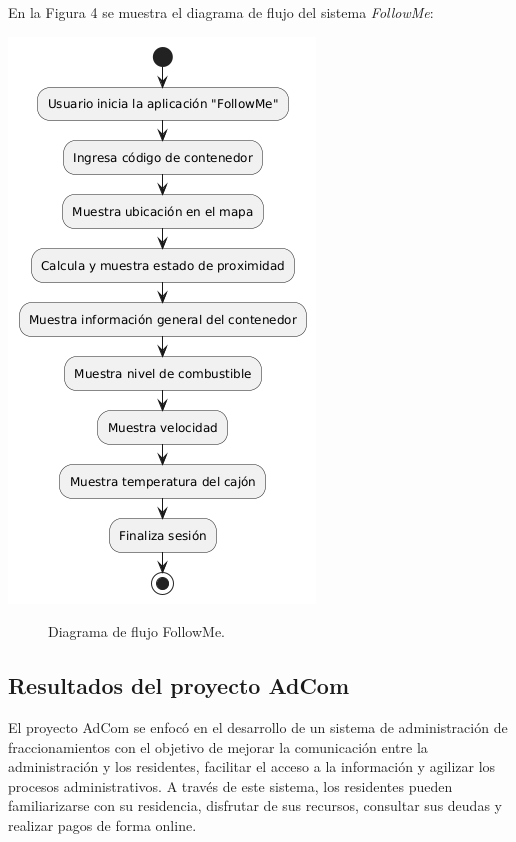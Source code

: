 \documentclass[protocolo.tex]{subfiles}
\begin{document}
En la Figura 4 se muestra el diagrama de flujo del sistema \textit{FollowMe}:\vspace{4mm}
\begin{center}
\includegraphics[scale=0.6]{Imagenes/Pdf/followmeF.png}
\end{center}
\begin{figure}[h]  %
    \centering
    \caption{Diagrama de flujo FollowMe.}
    \label{fig:mi-figura4}
\end{figure}
\subsection{Resultados del proyecto AdCom}

El proyecto AdCom se enfocó en el desarrollo de un sistema de administración de fraccionamientos con el objetivo de  mejorar la comunicación entre la administración y los residentes,  facilitar el acceso a la información y agilizar los procesos administrativos.  A través de este sistema, los residentes pueden  familiarizarse con su residencia,  disfrutar de sus recursos,  consultar sus deudas y realizar pagos de forma online.\vspace{4mm}
\end{document}
